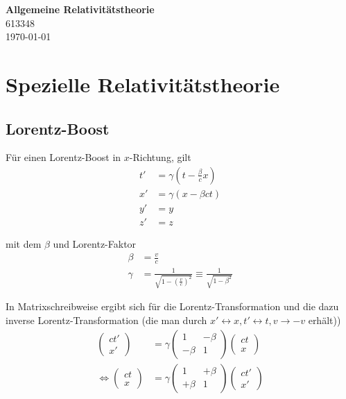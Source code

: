 \documentclass{article}
\newcommand{\lr}[1]{\left(#1\right)}
\begin{document}
\begin{center}
	\Large{\textbf{Allgemeine Relativitätstheorie}}\\
	\small{613348}\\
	\small{\today}
\end{center}

\tableofcontents


\newpage


\section{Spezielle Relativitätstheorie}
\subsection{Lorentz-Boost}
Für einen Lorentz-Boost in $x$-Richtung, gilt
	\begin{align}
		t' &= \gamma \lr{ t - \frac{\beta}{c} x } \\
		x' &= \gamma (x - \beta c t) \\
		y' &= y \\
		z' &= z
	\end{align}

mit dem $\beta$ und Lorentz-Faktor
	\begin{align}
		\beta &= \frac{v}{c} \\
		\gamma &= \frac{1}{\sqrt{1 - \lr{ \frac{v}{c}}^2 } } \equiv \frac{1}{\sqrt{1 - \beta^2 }}
	\end{align}

In Matrixschreibweise ergibt sich für die Lorentz-Transformation und die dazu inverse Lorentz-Transformation \textcolor{gruen}{(die man durch $x'\leftrightarrow x, t'\leftrightarrow t, v\to -v$ erhält)})
	\begin{align}
		\begin{pmatrix}
		ct' \\ x'
		\end{pmatrix}
		&=
		\gamma
		\begin{pmatrix}
			1 & -\beta \\
			-\beta & 1
		\end{pmatrix}
		\begin{pmatrix}
		ct \\ x
		\end{pmatrix} \\
		\Leftrightarrow \begin{pmatrix}
		ct \\ x
		\end{pmatrix}
		&=
		\gamma
		\begin{pmatrix}
			1 & +\beta \\
			+\beta & 1
		\end{pmatrix}
		\begin{pmatrix}
		ct' \\ x'
		\end{pmatrix}
	\end{align}
\end{document}
